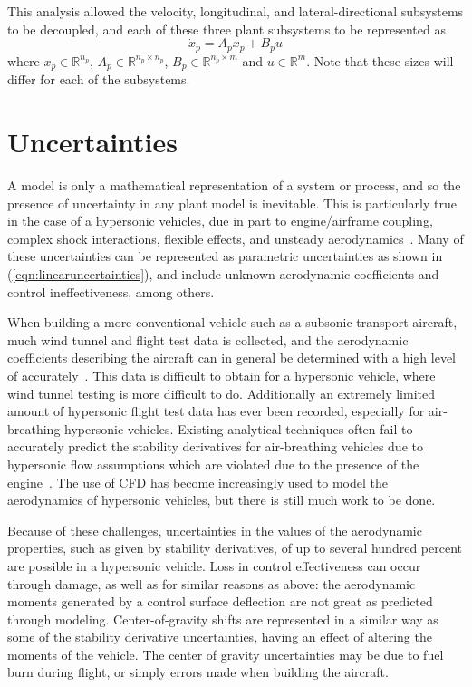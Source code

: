 This analysis allowed the velocity, longitudinal, and lateral-directional subsystems to be decoupled, and each of these three plant subsystems to be represented as
\begin{equation}
  \label{eqn:plantxp}
  \dot{x}_{p}=A_{p}x_{p}+B_{p}u
\end{equation}
where $x_{p}\in\mathbb{R}^{n_{p}}$, $A_{p}\in\mathbb{R}^{n_{p}\times n_{p}}$, $B_{p}\in\mathbb{R}^{n_{p}\times m}$ and $u\in\mathbb{R}^{m}$.
Note that these sizes will differ for each of the subsystems.

\section{Uncertainties}

A model is only a mathematical representation of a system or process, and so the presence of uncertainty in any plant model is inevitable.
This is particularly true in the case of a hypersonic vehicles, due in part to engine/airframe coupling, complex shock interactions, flexible effects, and unsteady aerodynamics\ \cite{mcruer.hypersonic.1991,schmidt.dynamics.1992,rudd.hypersonic.2010}.
Many of these uncertainties can be represented as parametric uncertainties as shown in (\ref{eqn:linearuncertainties}), and include unknown aerodynamic coefficients and control ineffectiveness, among others.

When building a more conventional vehicle such as a subsonic transport aircraft, much wind tunnel and flight test data is collected, and the aerodynamic coefficients describing the aircraft can in general be determined with a high level of accurately\ \cite{maine.coefficients.1981,morelli.parameters.1997}.
This data is difficult to obtain for a hypersonic vehicle, where wind tunnel testing is more difficult to do.
Additionally an extremely limited amount of hypersonic flight test data has ever been recorded, especially for air-breathing hypersonic vehicles.
Existing analytical techniques often fail to accurately predict the stability derivatives for air-breathing vehicles due to hypersonic flow assumptions which are violated due to the presence of the engine\ \cite{rudd.integrated.2000}.
The use of CFD has become increasingly used to model the aerodynamics of hypersonic vehicles, but there is still much work to be done.

Because of these challenges, uncertainties in the values of the aerodynamic properties, such as given by stability derivatives, of up to several hundred percent are possible in a hypersonic vehicle.
Loss in control effectiveness can occur through damage, as well as for similar reasons as above: the aerodynamic moments generated by a control surface deflection are not great as predicted through modeling.
Center-of-gravity shifts are represented in a similar way as some of the stability derivative uncertainties, having an effect of altering the moments of the vehicle.
The center of gravity uncertainties may be due to fuel burn during flight, or simply errors made when building the aircraft.

